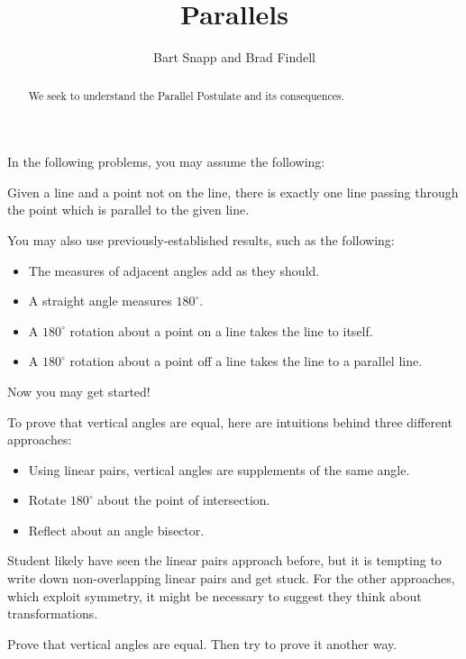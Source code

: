 \documentclass[nooutcomes]{ximera}
\title{Parallels}
\author{Bart Snapp and Brad Findell}
\begin{document}
\begin{abstract}
  We seek to understand the Parallel Postulate and its consequences.
\end{abstract}
\maketitle

In the following problems, you may assume the following: 

\begin{postulate}
Given a line and a point not on the line, there is exactly one line passing through the point which is parallel to the given line.
\end{postulate}

You may also use previously-established results, such as the following: 
\begin{itemize}
\itemsep -3pt
\item The measures of adjacent angles add as they should.
\item A straight angle measures $180^\circ$.  
\item A $180^\circ$ rotation about a point on a line takes the line to itself.  
\item A $180^\circ$ rotation about a point off a line takes the line to a parallel line.  
\end{itemize}

Now you may get started! 

\begin{teachingnote}
To prove that vertical angles are equal, here are intuitions behind three different approaches: 
\begin{itemize}
\item Using linear pairs, vertical angles are supplements of the same angle.  
\item Rotate $180^\circ$ about the point of intersection. 
\item Reflect about an angle bisector. 
\end{itemize}
Student likely have seen the linear pairs approach before, but it is tempting to write down non-overlapping linear pairs and get stuck.  For the other approaches, which exploit symmetry, it might be necessary to suggest they think about transformations.  
\end{teachingnote}

\begin{problem}
Prove that vertical angles are equal.  Then try to prove it another way.  
\end{problem}
\end{document}
